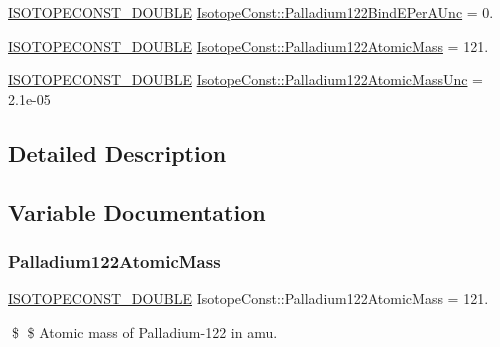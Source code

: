 \begin{DoxyCompactItemize}
\mbox{\hyperlink{group___isotope_const-_macros_ga8f45a7272ce02c0b4c65c44636ed719a}{I\+S\+O\+T\+O\+P\+E\+C\+O\+N\+S\+T\+\_\+\+D\+O\+U\+B\+LE}} \mbox{\hyperlink{group___isotope_const-_palladium-_pd122_gacba34592a65648412c457a4044d5affc}{Isotope\+Const\+::\+Palladium122\+Bind\+E\+Per\+A\+Unc}} = 0.
\item 
\mbox{\hyperlink{group___isotope_const-_macros_ga8f45a7272ce02c0b4c65c44636ed719a}{I\+S\+O\+T\+O\+P\+E\+C\+O\+N\+S\+T\+\_\+\+D\+O\+U\+B\+LE}} \mbox{\hyperlink{group___isotope_const-_palladium-_pd122_ga78890cbd33be7425f6b18bfd353b6d07}{Isotope\+Const\+::\+Palladium122\+Atomic\+Mass}} = 121.
\item 
\mbox{\hyperlink{group___isotope_const-_macros_ga8f45a7272ce02c0b4c65c44636ed719a}{I\+S\+O\+T\+O\+P\+E\+C\+O\+N\+S\+T\+\_\+\+D\+O\+U\+B\+LE}} \mbox{\hyperlink{group___isotope_const-_palladium-_pd122_ga8676048b28d90b33f3eedcebd0670391}{Isotope\+Const\+::\+Palladium122\+Atomic\+Mass\+Unc}} = 2.\+1e-\/05
\end{DoxyCompactItemize}


\subsection{Detailed Description}


\subsection{Variable Documentation}
\mbox{\label{group___isotope_const-_palladium-_pd122_ga78890cbd33be7425f6b18bfd353b6d07}} 
\subsubsection{\texorpdfstring{Palladium122\+Atomic\+Mass}{Palladium122AtomicMass}}
{\footnotesize\ttfamily \mbox{\hyperlink{group___isotope_const-_macros_ga8f45a7272ce02c0b4c65c44636ed719a}{I\+S\+O\+T\+O\+P\+E\+C\+O\+N\+S\+T\+\_\+\+D\+O\+U\+B\+LE}} Isotope\+Const\+::\+Palladium122\+Atomic\+Mass = 121.}

\$ \$ Atomic mass of Palladium-\/122 in amu. \mbox{\label{group___isotope_const-_palladium-_pd122_ga8676048b28d90b33f3eedcebd0670391}} 
